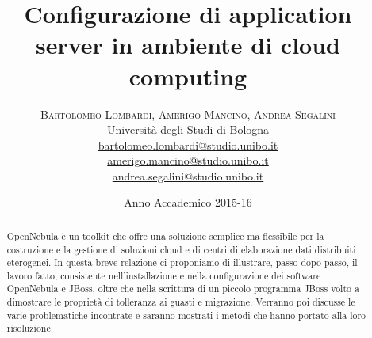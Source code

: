 \documentclass[twoside]{article}
\title{\vspace{-15mm}\fontsize{24pt}{10pt}\selectfont\textbf{Configurazione di application server in ambiente di cloud computing}} %
\author{
\large
\textsc{Bartolomeo Lombardi, Amerigo Mancino, Andrea Segalini}\\[2mm] %
\normalsize Università degli Studi di Bologna %
\vspace{5mm} \\
\normalsize \href{mailto:bartolomeo.lombardi@studio.unibo.it}{bartolomeo.lombardi@studio.unibo.it}\\
\normalsize \href{mailto:amerigo.mancino@studio.unibo.it}{amerigo.mancino@studio.unibo.it}\\
\normalsize \href{mailto:andrea.segalini@studio.unibo.it}{andrea.segalini@studio.unibo.it}
\vspace{-5mm}
}
\date{Anno Accademico 2015-16}
\begin{document}
\maketitle 


\begin{abstract}
\noindent
OpenNebula è un toolkit che offre una soluzione semplice ma flessibile per la costruzione e la gestione
di soluzioni cloud e di centri di elaborazione dati distribuiti eterogenei.
In questa breve relazione ci proponiamo di illustrare, passo dopo passo, il lavoro fatto, consistente
nell'installazione e nella configurazione dei software OpenNebula e JBoss, oltre che nella scrittura
di un piccolo programma JBoss volto a dimostrare le proprietà di tolleranza ai guasti e migrazione.
Verranno poi discusse le varie problematiche incontrate e saranno mostrati i metodi che hanno portato
alla loro risoluzione.
\end{abstract}


\vspace{15mm} %

\end{document}

